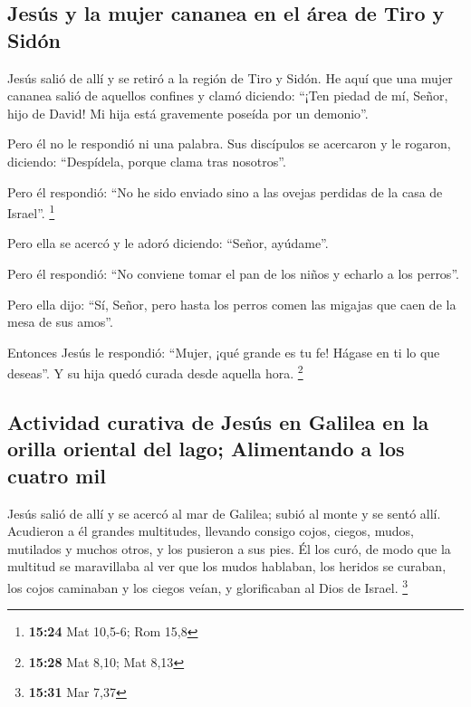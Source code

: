 \hypertarget{jesuxfas-y-la-mujer-cananea-en-el-uxe1rea-de-tiro-y-siduxf3n}{%
\subsection{Jesús y la mujer cananea en el área de Tiro y
Sidón}\label{jesuxfas-y-la-mujer-cananea-en-el-uxe1rea-de-tiro-y-siduxf3n}}

 Jesús salió de allí y se retiró a la región de Tiro y
Sidón.  He aquí que una mujer cananea salió de aquellos
confines y clamó diciendo: ``¡Ten piedad de mí, Señor, hijo de David! Mi
hija está gravemente poseída por un demonio''.

 Pero él no le respondió ni una palabra. Sus discípulos
se acercaron y le rogaron, diciendo: ``Despídela, porque clama tras
nosotros''.

 Pero él respondió: ``No he sido enviado sino a las
ovejas perdidas de la casa de Israel''. \footnote{\textbf{15:24} Mat
  10,5-6; Rom 15,8}

 Pero ella se acercó y le adoró diciendo: ``Señor,
ayúdame''.

 Pero él respondió: ``No conviene tomar el pan de los
niños y echarlo a los perros''.

 Pero ella dijo: ``Sí, Señor, pero hasta los perros comen
las migajas que caen de la mesa de sus amos''.

 Entonces Jesús le respondió: ``Mujer, ¡qué grande es tu
fe! Hágase en ti lo que deseas''. Y su hija quedó curada desde aquella
hora. \footnote{\textbf{15:28} Mat 8,10; Mat 8,13}

\hypertarget{actividad-curativa-de-jesuxfas-en-galilea-en-la-orilla-oriental-del-lago-alimentando-a-los-cuatro-mil}{%
\subsection{Actividad curativa de Jesús en Galilea en la orilla oriental
del lago; Alimentando a los cuatro
mil}\label{actividad-curativa-de-jesuxfas-en-galilea-en-la-orilla-oriental-del-lago-alimentando-a-los-cuatro-mil}}

 Jesús salió de allí y se acercó al mar de Galilea; subió
al monte y se sentó allí.  Acudieron a él grandes
multitudes, llevando consigo cojos, ciegos, mudos, mutilados y muchos
otros, y los pusieron a sus pies. Él los curó,  de modo
que la multitud se maravillaba al ver que los mudos hablaban, los
heridos se curaban, los cojos caminaban y los ciegos veían, y
glorificaban al Dios de Israel. \footnote{\textbf{15:31} Mar 7,37}

